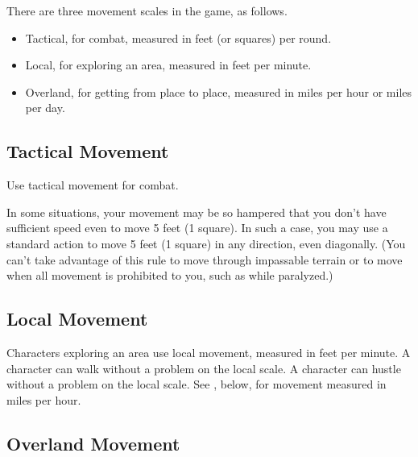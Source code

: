     There are three movement scales in the game, as follows.
    \begin{itemize}
        \item Tactical, for combat, measured in feet (or squares) per round.
        \item Local, for exploring an area, measured in feet per minute.
        \item Overland, for getting from place to place, measured in miles per
            hour or miles per day.
    \end{itemize}

    \subsection{Tactical Movement}
        Use tactical movement for combat.

         In some situations, your movement may be so hampered that you don't have sufficient speed even to move 5 feet (1 square). In such a case, you may use a standard action to move 5 feet (1 square) in any direction, even diagonally. (You can't take advantage of this rule to move through impassable terrain or to move when all movement is prohibited to you, such as while paralyzed.)

    \subsection{Local Movement}
        Characters exploring an area use local movement, measured in feet per minute.
         A character can walk without a problem on the local scale.
         A character can hustle without a problem on the local scale. See , below, for movement measured in miles per hour.

    \subsection{Overland Movement}

